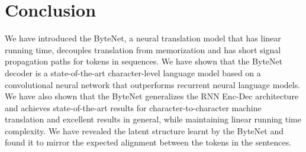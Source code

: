 \documentclass{article}
\begin{document}
\section{Conclusion}

We have introduced the ByteNet, a neural translation model that has linear running time, decouples translation from memorization and has short signal propagation paths for tokens in sequences. We have shown that the ByteNet decoder is a state-of-the-art character-level language model based on a convolutional neural network that outperforms recurrent neural language models. We have also shown that the ByteNet generalizes the RNN Enc-Dec architecture and achieves state-of-the-art results for character-to-character machine translation and excellent results in general, while maintaining linear running time complexity. We have revealed the latent structure learnt by the ByteNet and found it to mirror the expected alignment between the tokens in the sentences. 






\end{document}
